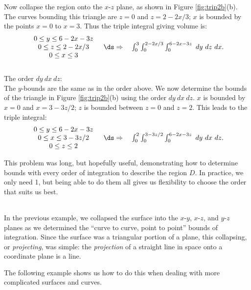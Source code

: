 {Now collapse the region onto the $x$-$z$ plane, as shown in Figure \ref{fig:trip2b}(b). The curves bounding this triangle are $z=0$ and $z=2-2x/3$; $x$ is bounded by the points $x=0$ to $x=3$. Thus the triple integral giving volume is: 
$$\begin{array}{cc}
		\begin{array}{c}
		0\leq y\leq 6-2x-3z\\
		0\leq z\leq 2-2x/3\\
		0\leq x\leq 3
		\end{array} 
		&
		\ds\Rightarrow \quad \int_0^3\int_0^{2-2x/3}\int_0^{6-2x-3z}\ dy\ dz\ dx.
	\end{array}
$$\\

\noindent The order $dy\ dx\ dz$:\\

The $y$-bounds are the same as in the order above. We now determine the bounds of the triangle in Figure \ref{fig:trip2b}(b) using the order $dy\ dx\ dz$. $x$ is bounded by $x=0$ and $x=3-3z/2$; $z$ is bounded between $z=0$ and $z=2$. This leads to the triple integral:
$$\begin{array}{cc}
		\begin{array}{c}
		0\leq y\leq 6-2x-3z\\
		0\leq x\leq 3-3z/2\\
		0\leq z\leq 2
		\end{array} 
		&
		\ds\Rightarrow \quad \int_0^2\int_0^{3-3z/2}\int_0^{6-2x-3z}\ dy\ dx\ dz.
	\end{array}
$$

This problem was long, but hopefully useful, demonstrating how to determine bounds with every order of integration to describe the region $D$. In practice, we only need 1, but being able to do them all gives us flexibility to choose the order that suits us best.
}\\

In the previous example, we collapsed the surface into the $x$-$y$, $x$-$z$, and $y$-$z$ planes as we determined the ``curve to curve, point to point'' bounds of integration. Since the surface was a triangular portion of a plane, this collapsing, or \textit{projecting}, was simple: the \textit{projection} of a straight line in space onto a coordinate plane is a line.

The following example shows us how to do this when dealing with more complicated surfaces and curves.\\

